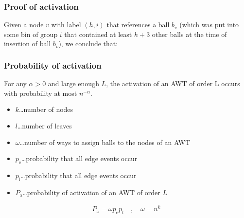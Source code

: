 \documentclass[serif,professionalfonts]{beamer}
\begin{document}
\begin{frame}
\frametitle{Proof of activation}
Given a node $v$ with label $(h,i)$ that references a ball $b_v$ (which was put into some bin of group $i$ that contained at least $h+3$ other balls at the time of insertion of ball $b_v$), \alert{we conclude} that:
\begin{enumerate}
\end{enumerate}
\end{frame}


\begin{frame}
\frametitle{Probability of activation}
\begin{lemma}
For any $\alpha > 0$ and large enough $L$, the activation of an AWT of order L occurs with probability at most $n^{-\alpha}$.
\end{lemma}
\medskip
\begin{itemize}
\item $k$\dots number of nodes
\item $l$\dots number of leaves
\item $\omega$\dots number of ways to assign balls to the nodes of an AWT
\item $p_\mathrm{e}$\dots probability that all edge events occur
\item $p_\mathrm{l}$\dots probability that all edge events occur
\item $P_\mathrm{a}$\dots probability of activation of an AWT of order $L$
\end{itemize}

\begin{align*}
P_\mathrm{a} = \omega p_e p_l \quad , \quad \omega = n^k 
\end{align*}
\end{frame}
\end{document}
